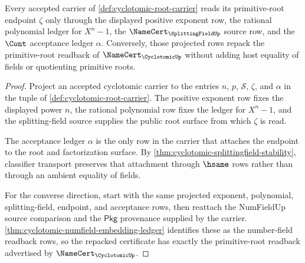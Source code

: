 \begin{theorem}
\label{thm:cyclotomic-primitive-root-readback-exactness}
Every accepted carrier of \autoref{def:cyclotomic-root-carrier} reads its primitive-root endpoint $\zeta$ only through the displayed positive exponent row, the rational polynomial ledger for $X^n-1$, the $\NameCert_{\SplittingFieldUp}$ source row, and the $\Cont$ acceptance ledger $\alpha$. Conversely, those projected rows repack the primitive-root readback of $\NameCert_{\CyclotomicUp}$ without adding host equality of fields or quotienting primitive roots.
\end{theorem}
\begin{proof}
Project an accepted cyclotomic carrier to the entries $n$, $p$, $\mathcal{S}$, $\zeta$, and $\alpha$ in the tuple of \autoref{def:cyclotomic-root-carrier}. The positive exponent row fixes the displayed power $n$, the rational polynomial row fixes the ledger for $X^n-1$, and the splitting-field source supplies the public root surface from which $\zeta$ is read.

The acceptance ledger $\alpha$ is the only row in the carrier that attaches the endpoint to the root and factorization surface. By \autoref{thm:cyclotomic-splittingfield-stability}, classifier transport preserves that attachment through $\hsame$ rows rather than through an ambient equality of fields.

For the converse direction, start with the same projected exponent, polynomial, splitting-field, endpoint, and acceptance rows, then reattach the NumFieldUp source comparison and the $\mathsf{Pkg}$ provenance supplied by the carrier. \autoref{thm:cyclotomic-numfield-embedding-ledger} identifies these as the number-field readback rows, so the repacked certificate has exactly the primitive-root readback advertised by $\NameCert_{\CyclotomicUp}$.
\end{proof}

